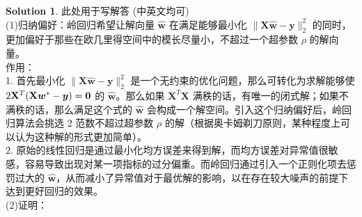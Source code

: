 \documentclass[a4paper]{article}
\numberwithin{equation}{section}
\theoremstyle{definition}
\newtheorem*{solution}{Solution}
\def \X {\mathbf{X}}
\def \w {\bm{w}}
\def \y {\bm{y}}
\begin{document}
\begin{solution}
此处用于写解答 (中英文均可)\\
(1)归纳偏好：岭回归希望让解向量 $\hat{\w}$ 在满足能够最小化 $\|\X\hat{\w} - \y\|_{2}^{2}$ 的同时，更加偏好于那些在欧几里得空间中的模长尽量小，不超过一个超参数 $\rho$ 的解向量。
\\
作用：\\
1. 首先最小化 $\|\X\hat{\w} - \y\|_{2}^{2}$ 是一个无约束的优化问题，那么可转化为求解能够使 $2\X^{T}(\X\w^{*}-\y) = \textbf{0\textbf{}}$ 的 $\hat{\w}$。那么如果 $\X^{T}\X$ 满秩的话，有唯一的闭式解；如果不满秩的话，那么满足这个式的 $\hat{\w}$ 会构成一个解空间。引入这个归纳偏好后，岭回归算法会挑选 $2$ 范数不超过超参数 $\rho$ 的解（根据奥卡姆剃刀原则，某种程度上可以认为这种解的形式更加简单）。\\
2. 原始的线性回归是通过最小化均方误差来得到解，而均方误差对异常值很敏感，容易导致出现对某一项指标的过分偏重。而岭回归通过引入一个正则化项去惩罚过大的 $\hat{\w}$，从而减小了异常值对于最优解的影响，以在存在较大噪声的前提下达到更好回归的效果。\\
(2)证明：


\end{solution}
\end{document}

